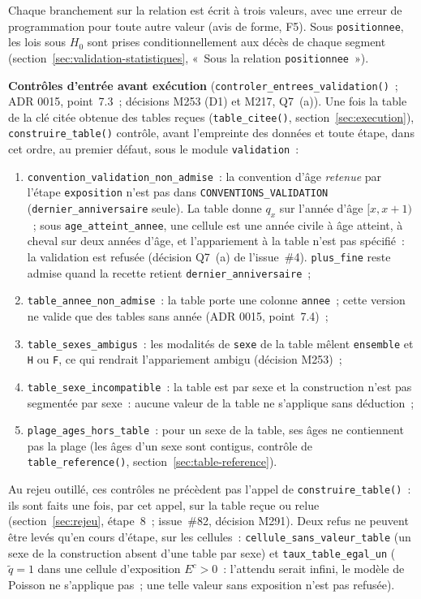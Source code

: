 \documentclass[a4paper,11pt]{article}
\newcommand{\code}[1]{\texttt{\small #1}}
\begin{document}
Chaque branchement sur la relation est écrit à trois valeurs, avec une
erreur de programmation pour toute autre valeur (avis de forme, F5).
Sous \code{positionnee}, les lois sous $H_0$ sont prises conditionnellement
aux décès de chaque segment (section~\ref{sec:validation-statistiques},
«~Sous la relation \code{positionnee}~»).

\medskip
\textbf{Contrôles d'entrée avant exécution} (\code{controler\_entrees\_validation()}~;
ADR 0015, point~7.3~; décisions M253 (D1) et M217, Q7~(a)). Une fois la
table de la clé citée obtenue des tables reçues (\code{table\_citee()},
section~\ref{sec:execution}), \code{construire\_table()} contrôle, avant
l'empreinte des données et toute étape, dans cet ordre, au premier défaut,
sous le module \code{validation}~:
\begin{enumerate}[leftmargin=*, itemsep=2pt]
  \item \code{convention\_validation\_non\_admise}~: la convention d'âge
    \emph{retenue} par l'étape \code{exposition} n'est pas dans
    \code{CONVENTIONS\_VALIDATION} (\code{dernier\_anniversaire} seule). La
    table donne $q_x$ sur l'année d'âge $[x, x+1)$~; sous
    \code{age\_atteint\_annee}, une cellule est une année civile à âge
    atteint, à cheval sur deux années d'âge, et l'appariement à la table
    n'est pas spécifié~: la validation est refusée (décision Q7~(a) de
    l'issue~\#4). \code{plus\_fine} reste admise quand la recette retient
    \code{dernier\_anniversaire}~;
  \item \code{table\_annee\_non\_admise}~: la table porte une colonne
    \code{annee}~; cette version ne valide que des tables sans année (ADR
    0015, point~7.4)~;
  \item \code{table\_sexes\_ambigus}~: les modalités de \code{sexe} de la
    table mêlent \code{ensemble} et \code{H} ou \code{F}, ce qui rendrait
    l'appariement ambigu (décision M253)~;
  \item \code{table\_sexe\_incompatible}~: la table est par sexe et la
    construction n'est pas segmentée par sexe~: aucune valeur de la table ne
    s'applique sans déduction~;
  \item \code{plage\_ages\_hors\_table}~: pour un sexe de la table, ses âges
    ne contiennent pas la plage (les âges d'un sexe sont contigus, contrôle
    de \code{table\_reference()}, section~\ref{sec:table-reference}).
\end{enumerate}
Au rejeu outillé, ces contrôles ne précèdent pas l'appel de
\code{construire\_table()}~: ils sont faits une fois, par cet appel, sur la
table reçue ou relue (section~\ref{sec:rejeu}, étape~8~; issue~\#82,
décision M291). Deux refus ne peuvent être levés qu'en cours d'étape, sur les
cellules~: \code{cellule\_sans\_valeur\_table} (un sexe de la construction
absent d'une table par sexe) et \code{taux\_table\_egal\_un} ($\tilde q =
1$ dans une cellule d'exposition $E^c > 0$~: l'attendu serait infini, le
modèle de Poisson ne s'applique pas~; une telle valeur sans exposition
n'est pas refusée).
\end{document}
